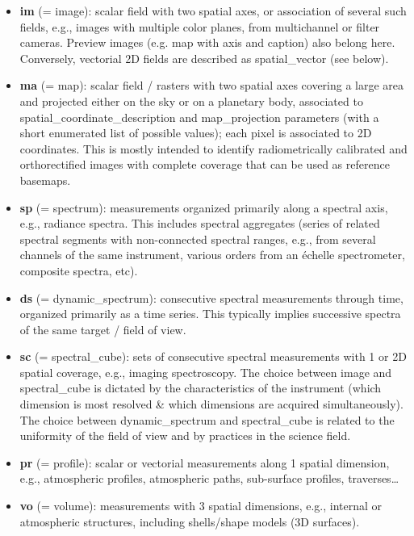 \documentclass[11pt,a4paper]{ivoa}
\begin{document}
\begin{itemize}

\item \textbf{im }(= image): scalar field with two spatial axes, or association of several such fields, e.g., images with multiple color planes, from multichannel or filter cameras. Preview images (e.g. map with axis and caption) also belong here. Conversely, vectorial 2D fields are described as spatial\_vector (see below).

\item \textbf{ma }(= map): scalar field / rasters with two spatial axes covering a large area and projected either on the sky or on a planetary body, associated to spatial\_coordinate\_description and map\_projection parameters (with a short enumerated list of possible values); each pixel is associated to 2D coordinates. This is mostly intended to identify radiometrically calibrated and orthorectified images with complete coverage that can be used as reference basemaps. 

\item \textbf{sp }(= spectrum): measurements organized primarily along a spectral axis, e.g., radiance spectra. This includes spectral aggregates (series of related spectral segments with non-connected spectral ranges, e.g., from several channels of the same instrument, various orders from an échelle spectrometer, composite spectra, etc).

\item \textbf{ds }(= dynamic\_spectrum): consecutive spectral measurements through time, organized primarily as a time series. This typically implies successive spectra of the same target / field of view.

\item \textbf{sc }(= spectral\_cube): sets of consecutive spectral measurements with 1 or 2D spatial coverage, e.g., imaging spectroscopy. The choice between image and spectral\_cube is dictated by the characteristics of the instrument (which dimension is most resolved \& which dimensions are acquired simultaneously). The choice between dynamic\_spectrum and spectral\_cube is related to the uniformity of the field of view and by practices in the science field.

\item \textbf{pr }(= profile): scalar or vectorial measurements along 1 spatial dimension, e.g., atmospheric profiles, atmospheric paths, sub-surface profiles, traverses…

\item \textbf{vo }(= volume): measurements with 3 spatial dimensions, e.g., internal or atmospheric structures, including shells/shape models (3D surfaces).


\end{itemize}
\end{document}
